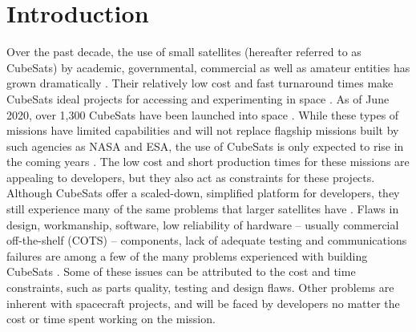 \documentclass[conf]{new-aiaa}
\begin{document}
\begin{abstract}
\end{abstract}


\section{Introduction}

Over the past decade, the use of small satellites (hereafter referred to as CubeSats) by academic, governmental, commercial as well as amateur entities has grown dramatically \cite{cubesat101,Poghosyan2016,Villela2019}. Their relatively low cost and fast turnaround times make CubeSats ideal projects for accessing and experimenting in space \cite{cubesat101}. As of June 2020, over 1,300 CubeSats have been launched into space \cite{Kulu2020}. While these types of missions have limited capabilities and will not replace flagship missions built by such agencies as NASA and ESA, the use of CubeSats is only expected to rise in the coming years \cite{Improving2017,cubesat101}. The low cost and short production times for these missions are appealing to developers, but they also act as constraints for these projects. Although CubeSats offer a scaled-down, simplified platform for developers, they still experience many of the same problems that larger satellites have \cite{Improving2017}. Flaws in design, workmanship, software, low reliability of hardware -- usually commercial off-the-shelf (COTS) -- components, lack of adequate testing and communications failures are among a few of the many problems experienced with building CubeSats \cite{Improving2017}. Some of these issues can be attributed to the cost and time constraints, such as parts quality, testing and design flaws. Other problems are inherent with spacecraft projects, and will be faced by developers no matter the cost or time spent working on the mission.\\
\end{document}
